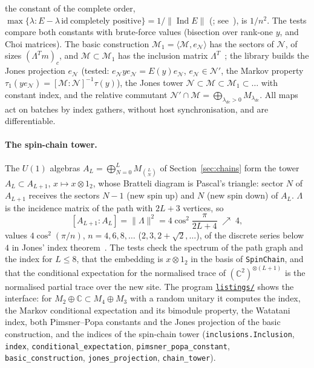 \documentclass[11pt]{article}
\newcommand{\C}{\mathbb{C}}
\newcommand{\M}{\mathcal{M}}
\newcommand{\repofile}[1]{\href{https://github.com/andre-a-no/von_neumann_type_i/blob/main/man/article/listings/#1}{\texttt{listings/\allowbreak\detokenize{#1}}}}
\begin{document}
the constant of the complete order, $\max\{\lambda:E-\lambda\,\mathrm{id}\ \text{completely positive}\}=
1/\|\operatorname{Ind}E\|$ (\cite[Th\'eor\`eme~3.5]{bdh1988}; see~\cite[proof of Proposition~1.5 and
Example~1.6]{frank1998}), is $1/n^2$. The tests compare both constants with brute-force values
(bisection over rank-one $y$, and Choi matrices). The basic construction $\M_1=\langle\M,e_{\mathcal N}\rangle$ has
the sectors of $\mathcal N$, of sizes $(\Lambda^Tm)_c$, and $\M\subset\M_1$ has the inclusion matrix
$\Lambda^T$~\cite{jones1983,ghj1989}; the library builds the Jones projection $e_{\mathcal N}$ (tested:
$e_{\mathcal N}ye_{\mathcal N}=E(y)e_{\mathcal N}$, $e_{\mathcal N}\in\mathcal N'$, the Markov property
$\tau_1(ye_{\mathcal N})=[\M:\mathcal N]^{-1}\tau(y)$), the Jones tower $\mathcal N\subset\M\subset\M_1\subset\dots$
with constant index, and the relative commutant $\mathcal N'\cap\M=\bigoplus_{\lambda_{dc}>0}M_{\lambda_{dc}}$. All
maps act on batches by index gathers, without host synchronisation, and are differentiable.

\paragraph{The spin-chain tower.} The $U(1)$ algebras $A_L=\bigoplus_{N=0}^LM_{\binom LN}$ of
Section~\ref{sec:chains} form the tower $A_L\subset A_{L+1}$, $x\mapsto x\otimes1_2$, whose Bratteli diagram is
Pascal's triangle: sector $N$ of $A_{L+1}$ receives the sectors $N-1$ (new spin up) and $N$ (new spin down) of $A_L$.
$\Lambda$ is the incidence matrix of the path with $2L+3$ vertices, so
\[
  [A_{L+1}:A_L]=\|\Lambda\|^2=4\cos^2\frac{\pi}{2L+4}\;\nearrow\;4 ,
\]
values $4\cos^2(\pi/n)$, $n=4,6,8,\dots$ ($2,3,2+\sqrt2,\dots$), of the discrete series below $4$ in Jones' index
theorem~\cite{jones1983}. The tests
check the spectrum of the path graph and the index for $L\le8$, that the embedding is $x\otimes1_2$ in the basis of
\texttt{SpinChain}, and that the conditional expectation for the normalised trace of $(\C^2)^{\otimes(L+1)}$ is the
normalised partial trace over the new site. The program \repofile{inclusions.py} shows the interface: for
$M_2\oplus\C\subset M_4\oplus M_3$ with a random unitary it computes the index, the Markov conditional expectation and
its bimodule property, the Watatani index, both Pimsner--Popa constants and the Jones projection of the basic
construction, and the indices of the spin-chain tower (\texttt{inclusions.Inclusion}, \texttt{index},
\texttt{conditional\_expectation}, \texttt{pimsner\_popa\_constant}, \texttt{basic\_construction},
\texttt{jones\_projection}, \texttt{chain\_tower}).
\end{document}
